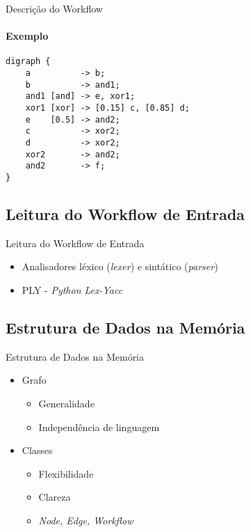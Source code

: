 \documentclass[xcolor=x11names,compress]{beamer}
\renewcommand{\(}{\begin{columns}}
\renewcommand{\)}{\end{columns}}
\newcommand{\<}[1]{\begin{column}{#1}}
\renewcommand{\>}{\end{column}}
\begin{document}
\begin{frame}[fragile]{Descrição do Workflow}
    \framesubtitle{Exemplo}
    \begin{lstlisting}[basicstyle=\tiny]
digraph {
    a          -> b;
    b          -> and1;
    and1 [and] -> e, xor1;
    xor1 [xor] -> [0.15] c, [0.85] d;
    e    [0.5] -> and2;
    c          -> xor2;
    d          -> xor2;
    xor2       -> and2;
    and2       -> f;
}
    \end{lstlisting}
\end{frame}

    \subsection{Leitura do Workflow de Entrada}
        \begin{frame}{Leitura do Workflow de Entrada}
            \begin{itemize}[<+->]
                \item Analisadores léxico (\emph{lexer}) e sintático (\emph{parser})
                \item PLY - \emph{Python Lex-Yacc}
            \end{itemize}
        \end{frame}

    \subsection{Estrutura de Dados na Memória}
        \begin{frame}{Estrutura de Dados na Memória}
            \begin{itemize}
                \item<1-> Grafo
                    \begin{itemize}
                        \item<1-> Generalidade
                        \item<1-> Independência de linguagem
                    \end{itemize}
                \item<2-> Classes
                    \begin{itemize}
                        \item<2-> Flexibilidade
                        \item<2-> Clareza
                        \item<3-> \emph{Node, Edge, Workflow}
                    \end{itemize}
            \end{itemize}
        \end{frame}
\end{document}
